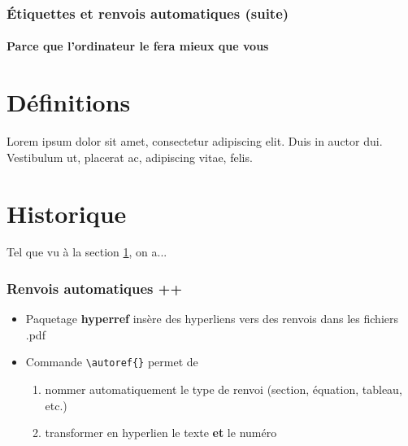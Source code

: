 
\begin{frame}[c,fragile]

	\frametitle{Étiquettes et renvois automatiques (suite)}
	\framesubtitle{Parce que l'ordinateur le fera mieux que vous}
	
	\begin{codesource}
	\section{Définitions}
	\label{sec:definitions}
	Lorem ipsum dolor sit amet, consectetur
	adipiscing elit. Duis in auctor dui. Vestibulum
	ut, placerat ac, adipiscing vitae, felis.
	\section{Historique}
	Tel que vu à la section \ref{sec:definitions},
	on a...
	\end{codesource}
\end{frame}


\begin{frame}[c,fragile]

	\frametitle{Renvois automatiques ++}
	
	\begin{itemize}
		\item Paquetage \textbf{hyperref} insère des hyperliens vers des renvois dans les fichiers
		.pdf
		\item Commande \lstinline|\autoref{}| permet de
		
			\begin{enumerate}
				\item nommer automatiquement le type de renvoi (section, équation, tableau, etc.)
				\item transformer en hyperlien le texte \textbf{et} le numéro
			\end{enumerate}
	\end{itemize}
\end{frame}
